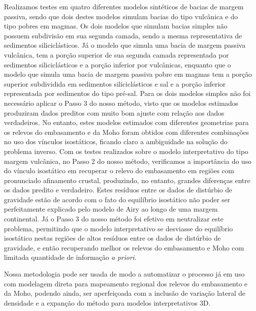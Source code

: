 Realizamos testes em quatro diferentes modelos sintéticos de bacias de margem passiva, sendo que dois destes modelos simulam bacias do tipo vulcânica e do tipo pobres em magmas. Os dois modelos que simulam bacias simples não possuem subdivisão em sua segunda camada, sendo a mesma representativa de sedimentos siliciclásticos. Já o modelo que simula uma bacia de margem passiva vulcânica, tem a porção superior de sua segunda camada representada por sedimentos siliciclásticos e a porção inferior por vulcânicas, enquanto que o modelo que simula uma bacia de margem passiva pobre em magmas tem a porção superior subdividida em sedimentos siliciclásticos e sal e a porção inferior representada por sedimentos do tipo pré-sal. Para os dois modelos simples não foi necessário aplicar o Passo 3 do nosso método, visto que os modelos estimados produziram dados preditos com muito bom ajuste com relação aos dados verdadeiros. No entanto, estes modelos estimados com diferentes geometrias para os relevos do embasamento e da Moho foram obtidos com diferentes combinações no uso dos vínculos isostáticos, ficando claro a ambiguidade na solução do problema inverso. Com os testes realizados sobre o modelo interpretativo do tipo margem vulcânica, no Passo 2 do nosso método, verificamos a importância do uso do vínculo isostático em recuperar o relevo do embasamento em regiões com pronunciado afinamento crustal, produzindo, no entanto, grandes diferenças entre os dados predito e verdadeiro. Estes resíduos entre os dados de distúrbio de gravidade estão de acordo com o fato do equilíbrio isostático não poder ser perfeitamente explicado pelo modelo de Airy ao longo de uma margem continental. Já o Passo 3 do nosso método foi efetivo em neutralizar este problema, permitindo que o modelo interpretativo se desviasse do equilíbrio isostático nestas regiões de altos resíduos entre os dados de distúrbio de gravidade, e então recuperando melhor os relevos do embasamento e Moho com limitada quantidade de informação \textit{a priori}. 

Nossa metodologia pode ser usada de modo a automatizar o processo já em uso com modelagem direta para mapeamento regional dos relevos do embasamento e da Moho, podendo ainda, ser aperfeiçoada com a inclusão de variação lateral de densidade e a expanção do método para modelos interpretativos 3D.


